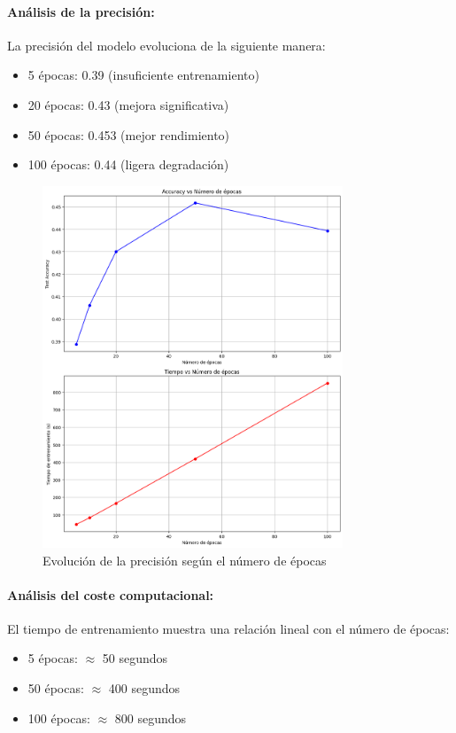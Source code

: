 \documentclass[11pt,a4paper]{article}
\begin{document}
\paragraph{Análisis de la precisión:}
La precisión del modelo evoluciona de la siguiente manera:
\begin{itemize}
	\item 5 épocas: 0.39 (insuficiente entrenamiento)
	\item 20 épocas: 0.43 (mejora significativa)
	\item 50 épocas: 0.453 (mejor rendimiento)
	\item 100 épocas: 0.44 (ligera degradación)
\end{itemize}

\begin{figure}[H]
	\centering
	\includegraphics[width=0.8\textwidth]{images/accuracy_vs_epocas}
	\caption{Evolución de la precisión según el número de épocas}
	\label{fig:accuracy_epocas}
\end{figure}

\paragraph{Análisis del coste computacional:}
El tiempo de entrenamiento muestra una relación lineal con el número de épocas:
\begin{itemize}
	\item 5 épocas: $\approx$ 50 segundos
	\item 50 épocas: $\approx$ 400 segundos
	\item 100 épocas: $\approx$ 800 segundos
\end{itemize}
\end{document}

